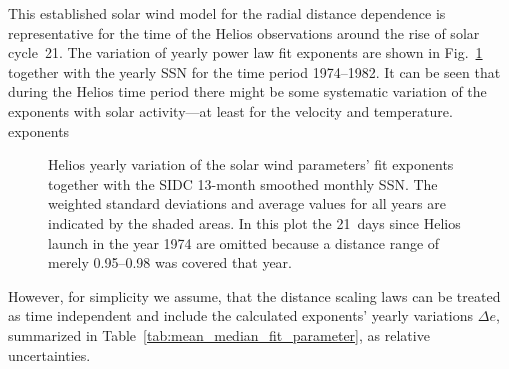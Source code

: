 This established solar wind model for the radial distance dependence is representative for the time of the Helios observations around the rise of solar cycle~21. The variation of yearly power law fit exponents are shown in Fig.~\ref{fig:yearly_gradients_c} together with the yearly SSN for the time period \numrange{1974}{1982}. It can be seen that during the Helios time period there might be some systematic  variation of the exponents with solar activity---at least for the velocity and temperature. exponents
\begin{figure}
	\caption{Helios yearly variation of the solar wind parameters' fit exponents together with the SIDC 13-month smoothed monthly SSN. The weighted standard deviations and average values for all years are indicated by the shaded areas. In this plot the 21~days since Helios launch in the year 1974 are omitted because a distance range of merely \SIrange{0.95}{0.98}{\au} was covered that year.}
	\label{fig:yearly_gradients_c}
\end{figure}
However, for simplicity we assume, that the distance scaling laws can be treated as time independent and include the calculated exponents’ yearly variations $\Delta e$, summarized in Table~\ref{tab:mean_median_fit_parameter}, as relative uncertainties.

